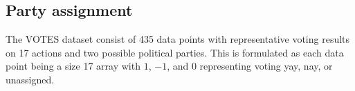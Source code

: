 \subsection{Party assignment}
The VOTES dataset consist of 435 data points with representative voting results on 17 actions and two possible political parties. This is formulated as each data point being a size 17 array with $1$, $-1$, and $0$ representing voting yay, nay, or unassigned.  








 

